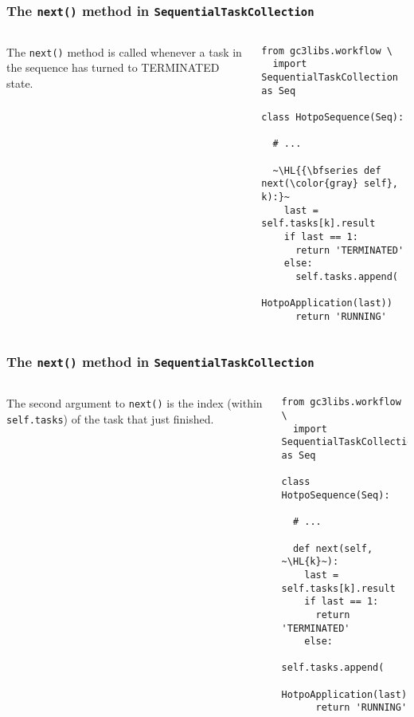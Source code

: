 \documentclass[english,serif,mathserif,xcolor=pdftex,dvipsnames,table]{beamer}
\begin{document}
\begin{frame}[fragile]
  \frametitle{The \texttt{next()} method in \texttt{SequentialTaskCollection}}
  \label{sec:14}

  \begin{columns}
    The \lstinline|next()| method is called whenever a
    task in the sequence has turned to TERMINATED state.


    \begin{lstlisting}[basicstyle=\ttfamily\footnotesize]
from gc3libs.workflow \
  import SequentialTaskCollection as Seq

class HotpoSequence(Seq):

  # ...

  ~\HL{{\bfseries def next(\color{gray} self}, k):}~
    last = self.tasks[k].result
    if last == 1:
      return 'TERMINATED'
    else:
      self.tasks.append(
        HotpoApplication(last))
      return 'RUNNING'
    \end{lstlisting}
  \end{columns}
\end{frame}


\begin{frame}[fragile]
  \frametitle{The \texttt{next()} method in \texttt{SequentialTaskCollection}}
  \label{sec:14}

  \begin{columns}
    The second argument to \lstinline|next()| is the index (within
    \lstinline|self.tasks|) of the task that just finished.


    \begin{lstlisting}[basicstyle=\ttfamily\footnotesize]
from gc3libs.workflow \
  import SequentialTaskCollection as Seq

class HotpoSequence(Seq):

  # ...

  def next(self, ~\HL{k}~):
    last = self.tasks[k].result
    if last == 1:
      return 'TERMINATED'
    else:
      self.tasks.append(
        HotpoApplication(last))
      return 'RUNNING'
    \end{lstlisting}
  \end{columns}
\end{frame}
\end{document}
